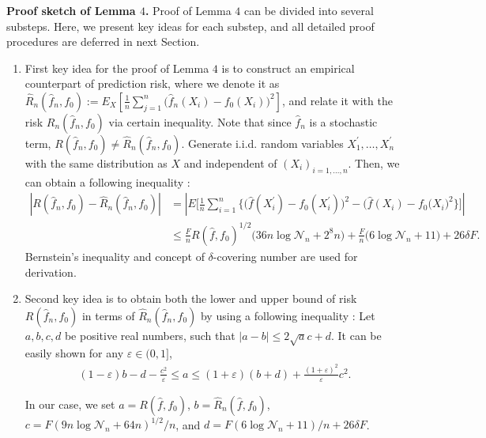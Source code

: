 \documentclass{article}
\theoremstyle{definition}
\begin{document}
\noindent\textbf{Proof sketch of Lemma $4$.}
Proof of Lemma $4$ can be divided into several substeps. 
Here, we present key ideas for each substep, and all detailed proof procedures are deferred in next Section.

\begin{enumerate}
    \item First key idea for the proof of Lemma $4$ is to construct an empirical counterpart of prediction risk, where we denote it as $\widehat{R}_{n}(\widehat{f}_{n},f_{0}):=E_{X}[\frac{1}{n}\sum_{j=1}^{n} \big( \widehat{f}_{n}(X_{i})-f_{0}(X_{i}) \big)^{2} ]$, and relate it with the risk $R_n(\widehat{f}_{n},f_{0})$ via certain inequality. 
    Note that since $\widehat{f}_{n}$ is a stochastic term, $R(\widehat{f}_{n},f_{0})\neq \widehat{R}_{n}(\widehat{f}_{n},f_{0})$.
    Generate i.i.d. random variables $X^{'}_{1},\dots,X^{'}_{n}$ with the same distribution as $X$ and independent of $(X_{i})_{i=1,\dots,n}$.
    Then, we can obtain a following inequality :
    \begin{align*}
    \left| R(\widehat{f}_{n},f_{0}) - \widehat{R}_{n}(\widehat{f}_{n},f_{0}) \right|
    &=\left| E \bigg[ \frac{1}{n} \sum_{i=1}^{n} \bigg\{ \big( \widehat{f}(X^{'}_{i}) - f_{0}(X^{'}_{i}) \big)^{2} - \big( \widehat{f}(X_{i}) - f_{0}(X_{i} \big)^{2} \bigg\} \bigg] \right| \\
    &\leq \frac{F}{n}R(\widehat{f},f_{0})^{1/2}\big( 36n\log\mathcal{N}_{n}+2^{8}n \big) + \frac{F}{n}\big( 6\log\mathcal{N}_{n} + 11 \big) + 26\delta F.
    \end{align*}
    Bernstein's inequality and concept of $\delta$-covering number are used for derivation.
    
    \item Second key idea is to obtain both the lower and upper bound of risk  $R(\widehat{f}_{n},f_{0})$ in terms of $\widehat{R}_{n}(\widehat{f}_{n},f_{0})$ by using a following inequality :
    Let $a,b,c,d$ be positive real numbers, such that $|a-b|\leq 2\sqrt{a}c+d$. It can be easily shown for any $\varepsilon\in(0,1]$,
    \begin{eqnarray*}
        (1-\varepsilon)b-d-\frac{c^2}{\varepsilon}
        \leq a \leq (1+\varepsilon)(b+d)+\frac{(1+\varepsilon)^{2}}{\varepsilon}c^2.
    \end{eqnarray*}

    In our case, we set $a=R(\widehat{f},f_{0})$, $b=\widehat{R}_{n}(\widehat{f},f_{0})$, $c=F(9n\log\mathcal{N}_{n}+64n)^{1/2}/n$, and $d=F(6\log\mathcal{N}_{n}+11)/n+26\delta F$.
    

\end{enumerate}
\end{document}
